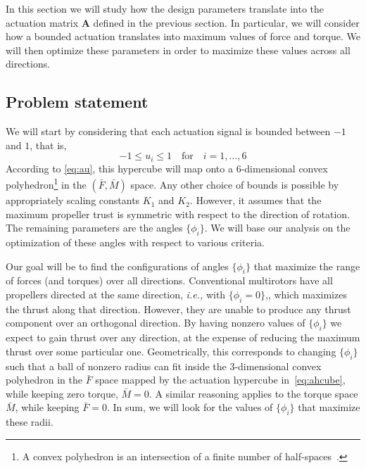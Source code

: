
In this section we will study how the design parameters translate into
the actuation matrix $\mathbf{A}$ defined in the previous section. In
particular, we will consider how a bounded actuation translates into
maximum values of force and torque. We will then optimize these
parameters in order to maximize these values across all directions.

\subsection{Problem statement}
\label{sec:problem-statement}


We will start by considering that each actuation signal is
bounded between $-1$ and $1$, that is,
\begin{equation}
  \label{eq:ahcube}
  -1 \leq u_i \leq 1 \quad \text{for} \quad i=1,\ldots,6
\end{equation}
According to \eqref{eq:au}, this hypercube will map onto a
6-dimensional convex polyhedron\footnote{A convex polyhedron is an
  intersection of a finite number of half-spaces~\cite{jeter86}.} in
the $(\bar{F}, \bar{M})$ space.  Any other choice of bounds is
possible by appropriately scaling constants $K_1$ and $K_2$.  However,
it assumes that the maximum propeller trust is symmetric with respect
to the direction of rotation. The remaining parameters are the angles
$\{\phi_i\}$. We will base our analysis on the optimization of these
angles with respect to various criteria.

Our goal will be to find the configurations of angles $\{\phi_i\}$
that maximize the range of forces (and torques) over all
directions. Conventional multirotors have all propellers directed at
the same direction, \textit{i.e.,} with $\{\phi_i=0\}$,, which
maximizes the thrust along that direction. However, they are unable to
produce any thrust component over an orthogonal direction. By having
nonzero values of $\{\phi_i\}$
we expect to gain thrust over any direction, at the
expense of reducing the maximum thrust over some particular one.
Geometrically, this corresponds to changing $\{\phi_i\}$
such that a ball of nonzero radius can fit inside the 3-dimensional
convex polyhedron in the $\bar{F}$ space mapped by the actuation
hypercube in~\eqref{eq:ahcube}, while keeping zero torque,
$\bar{M}=0$. A similar reasoning applies to the torque space
$\bar{M}$, while keeping $\bar{F}=0$. In sum, we will look for the values of $\{\phi_i\}$ that
maximize these radii.


